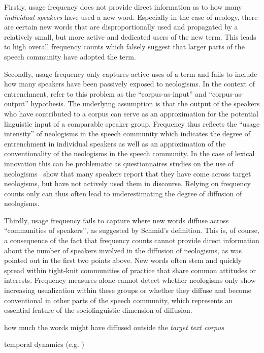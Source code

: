 \documentclass[a4paper, abstract=on]{scrartcl}
\begin{document}
    Firstly, usage frequency does not provide direct information as to how many \emph{individual speakers} have used a new word. Especially in the case of neology, there are certain new words that are disproportionally used and propagated by a relatively small, but more active and dedicated users of the new term. This leads to high overall frequency counts which falsely suggest that larger parts of the speech community have adopted the term.

    Secondly, usage frequency only captures active uses of a term and fails to include how many speakers have been passively exposed to neologisms. In the context of entrenchment, \textcite{Stefanowitsch2017} refer to this problem as the \enquote{corpus-as-input} and \enquote{corpus-as-output} hypothesis. The underlying assumption is that the output of the speakers who have contributed to a corpus can serve as an approximation for the potential linguistic input of a comparable speaker group. Frequency thus reflects the \enquote{usage intensity} of neologisms in the speech community which indicates the degree of entrenchment in individual speakers as well as an approximation of the conventionality of the neologisms in the speech community. In the case of lexical innovation this can be problematic as questionnaires studies on the use of neologisms~\parencite{Kerremans2015} show that many speakers report that they have come across target neologisms, but have not actively used them in discourse. Relying on frequency counts only can thus often lead to underestimating the degree of diffusion of neologisms.

    Thirdly, usage frequency fails to capture where new words diffuse across \enquote{communities of speakers}, as suggested by Schmid's definition. This is, of course, a consequence of the fact that frequency counts cannot provide direct information about the number of speakers involved in the diffusion of neologisms, as was pointed out in the first two points above. New words often stem and quickly spread within tight-knit communities of practice that share common attitudes or interests. Frequency measures alone cannot detect whether neologisms only show increasing usualization within these groups or whether they diffuse and become conventional in other parts of the speech community, which represents an essential feature of the sociolinguistic dimension of diffusion.


    how much the words might have diffused outside the \emph{target text corpus}

    temporal dynamics (e.g. )
\end{document}
